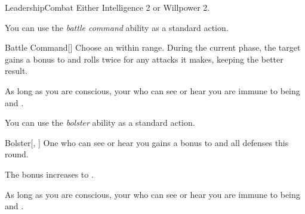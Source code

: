    \begin{feat}{Leadership}{Combat}
        \featpre Either Intelligence 2 or Willpower 2.

         You can use the \textit{battle command} ability as a standard action.
        \begin{activeability}{Battle Command}[]
            \rankline
            Choose an  within \rngmed range.
            During the current phase, the target gains a  bonus to  and rolls twice for any attacks it makes, keeping the better result.
        \end{activeability}

         As long as you are conscious, your  who can see or hear you are immune to being \frightened and \panicked.

         You can use the \textit{bolster} ability as a standard action.
        \begin{activeability}{Bolster}[, ]
            \rankline
            One  who can see or hear you gains a  bonus to  and all defenses this round.

            \rankline
             The bonus increases to .
        \end{activeability}

         As long as you are conscious, your  who can see or hear you are immune to being \stunned and \confused.
    \end{feat}

